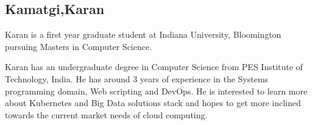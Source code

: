 \subsection{Kamatgi,Karan}

Karan is a first year graduate student at Indiana University, Bloomington 
pursuing Masters in Computer Science. 

Karan has an undergraduate degree in Computer Science from PES Institute of 
Technology, India. 
He has around 3 years of experience in the Systems programming domain,
Web scripting and DevOps.
He is interested to learn more about Kubernetes and Big Data solutions 
stack and hopes to get more inclined towards the current market needs of cloud 
computing.


